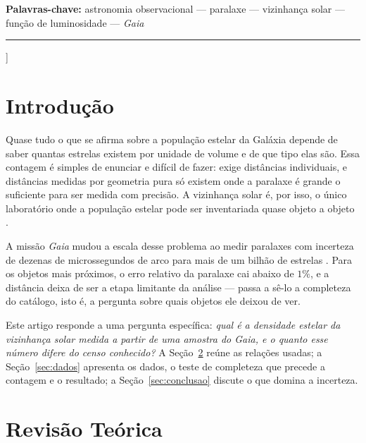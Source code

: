 \documentclass[10pt,a4paper,twocolumn]{article}
\begin{document}
\begin{@twocolumnfalse}
{\vspace{0.6em}
\noindent\textbf{Palavras-chave:} astronomia observacional --- paralaxe
--- vizinhança solar --- função de luminosidade --- \textit{Gaia}
}

\vspace{0.5em}
\noindent\rule{\textwidth}{0.3pt}
\vspace{1.4em}

\end{@twocolumnfalse}
]
\thispagestyle{primeira}

\section{Introdução}

Quase tudo o que se afirma sobre a população estelar da Galáxia depende de
saber quantas estrelas existem por unidade de volume e de que tipo elas
são. Essa contagem é simples de enunciar e difícil de fazer: exige
distâncias individuais, e distâncias medidas por geometria pura só existem
onde a paralaxe é grande o suficiente para ser medida com precisão. A
vizinhança solar é, por isso, o único laboratório onde a população estelar
pode ser inventariada quase objeto a objeto \cite{carroll}.

A missão \textit{Gaia} mudou a escala desse problema ao medir paralaxes
com incerteza de dezenas de microssegundos de arco para mais de um bilhão
de estrelas \cite{gaia}. Para os objetos mais próximos, o erro relativo da
paralaxe cai abaixo de $1\%$, e a distância deixa de ser a etapa
limitante da análise --- passa a sê-lo a completeza do catálogo, isto é, a
pergunta sobre quais objetos ele deixou de ver.

Este artigo responde a uma pergunta específica: \emph{qual é a densidade
estelar da vizinhança solar medida a partir de uma amostra do
\textit{Gaia}, e o quanto esse número difere do censo conhecido?} A
Seção~\ref{sec:teoria} reúne as relações usadas; a Seção~\ref{sec:dados}
apresenta os dados, o teste de completeza que precede a contagem e o
resultado; a Seção~\ref{sec:conclusao} discute o que domina a incerteza.

\section{Revisão Teórica}
\label{sec:teoria}
\end{document}
